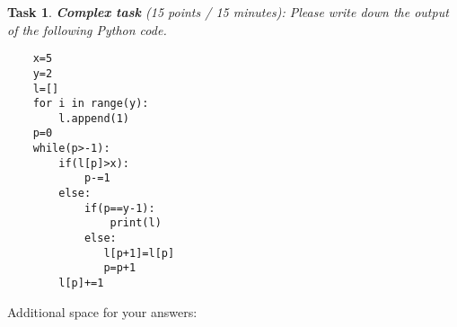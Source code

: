 \documentclass[UTF8]{ctexart}
\newtheorem{task}{Task}
\begin{document}
\newpage

\begin{task}
{\textbf{Complex task}} (15 points / 15 minutes): Please write down the output of the following Python code.
\end{task}
\begin{verbatim}
    x=5
    y=2
    l=[]
    for i in range(y):
        l.append(1)
    p=0
    while(p>-1):
        if(l[p]>x):
            p-=1
        else:
            if(p==y-1):
                print(l)
            else:
               l[p+1]=l[p]
               p=p+1
        l[p]+=1
\end{verbatim}

\newpage
Additional space for your answers:
\mbox{~}
\clearpage
\end{document}
